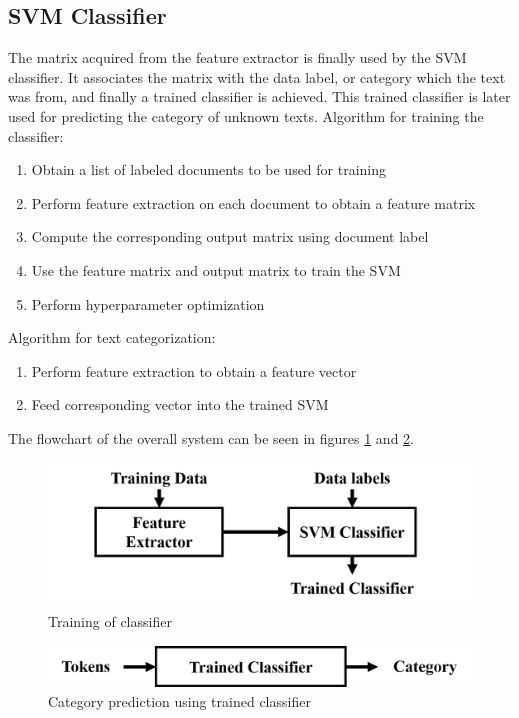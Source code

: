 \documentclass[fleqn --11pt --twoside]{IOEGC2016} %
\begin{document}
\subsection{SVM Classifier}
The matrix acquired from the feature extractor is finally used by the SVM classifier.  It associates the matrix with the data label, or category which the text was from, and finally a trained classifier is achieved. This trained classifier is later used for predicting the category of unknown texts.\newline
Algorithm for training the classifier:
\begin{enumerate}
\item Obtain a list of labeled documents to be used for training
\item Perform feature extraction on each document to obtain a feature matrix
\item Compute the corresponding output matrix using document label
\item Use the feature matrix and output matrix to train the SVM
\item Perform hyperparameter optimization
\end{enumerate}
Algorithm for text categorization:
\begin{enumerate}
\item Perform feature extraction to obtain a feature vector
\item Feed corresponding vector into the trained SVM
\end{enumerate}
The flowchart of the overall system can be seen in figures \ref{fig:training} and \ref{fig:category}.
\begin{figure}[!ht]
\centering
\includegraphics[width=\linewidth]{assets/training}
\caption{Training of classifier}
\label{fig:training}
\end{figure}
\begin{figure}[!ht]
\centering
\includegraphics[width=\linewidth]{assets/category}
\caption{Category prediction using trained classifier}
\label{fig:category}
\end{figure}
\end{document}
